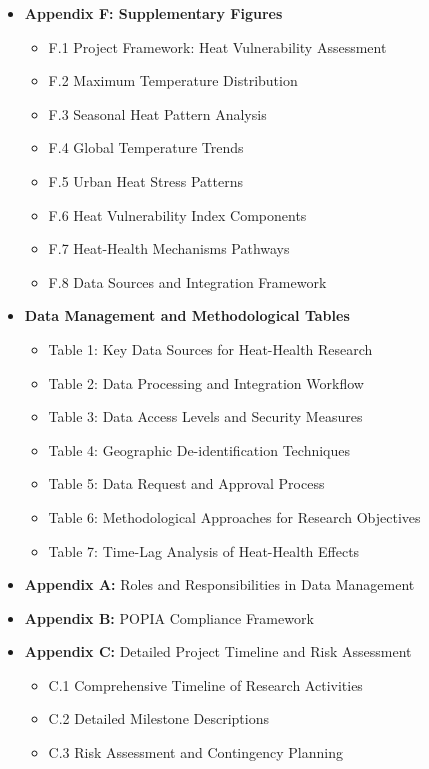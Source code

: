 \documentclass[12pt,a4paper]{article}
\begin{document}
\begin{itemize}[leftmargin=*, itemsep=0.3em]
    \item \textbf{Appendix F: Supplementary Figures}
    \begin{itemize}[leftmargin=*]
        \item F.1 Project Framework: Heat Vulnerability Assessment
        \item F.2 Maximum Temperature Distribution
        \item F.3 Seasonal Heat Pattern Analysis
        \item F.4 Global Temperature Trends
        \item F.5 Urban Heat Stress Patterns
        \item F.6 Heat Vulnerability Index Components
        \item F.7 Heat-Health Mechanisms Pathways
        \item F.8 Data Sources and Integration Framework
    \end{itemize}
    
    \item \textbf{Data Management and Methodological Tables}
    \begin{itemize}[leftmargin=*]
        \item Table 1: Key Data Sources for Heat-Health Research
        \item Table 2: Data Processing and Integration Workflow
        \item Table 3: Data Access Levels and Security Measures
        \item Table 4: Geographic De-identification Techniques
        \item Table 5: Data Request and Approval Process
        \item Table 6: Methodological Approaches for Research Objectives
        \item Table 7: Time-Lag Analysis of Heat-Health Effects
    \end{itemize}
    
    \item \textbf{Appendix A:} Roles and Responsibilities in Data Management
    
    \item \textbf{Appendix B:} POPIA Compliance Framework
    
    \item \textbf{Appendix C:} Detailed Project Timeline and Risk Assessment
    \begin{itemize}[leftmargin=*]
        \item C.1 Comprehensive Timeline of Research Activities
        \item C.2 Detailed Milestone Descriptions
        \item C.3 Risk Assessment and Contingency Planning
    \end{itemize}
    

\end{itemize}
\end{document}
